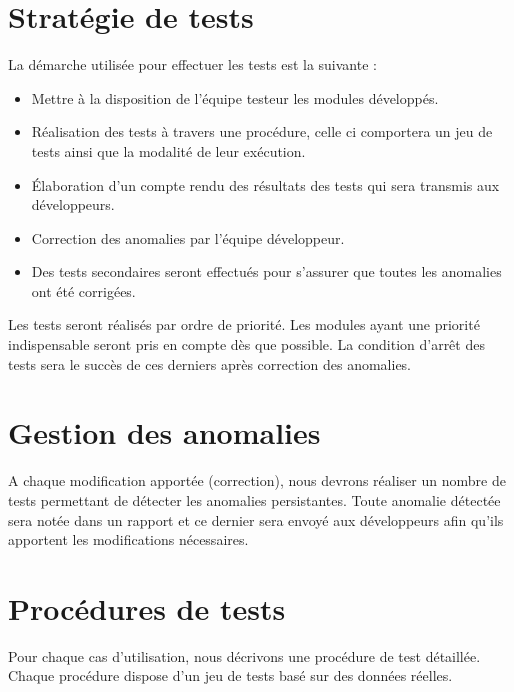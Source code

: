 \documentclass[a4paper,11pt,french]{article}
\begin{document}
\newpage
	
\section{Stratégie de tests}

La démarche utilisée pour effectuer les tests est la suivante :
\begin{itemize}
\item Mettre à la disposition de l’équipe testeur les modules développés.
\item Réalisation des tests à travers une procédure, celle ci comportera
un jeu de tests ainsi que la modalité de leur exécution.
\item Élaboration d'un compte rendu des résultats des tests qui sera
transmis aux développeurs.
\item Correction des anomalies par l'équipe développeur.
\item Des tests secondaires seront effectués pour s'assurer que toutes les
anomalies ont été corrigées.
\end{itemize}

Les tests seront réalisés par ordre de priorité. Les modules ayant une
priorité indispensable seront pris en compte dès que possible. La condition
d'arrêt des tests sera le succès de ces derniers après correction des
anomalies.

\section{Gestion des anomalies}

A chaque modification apportée (correction), nous devrons réaliser un nombre
de tests permettant de détecter les anomalies persistantes. Toute anomalie
détectée sera notée dans un rapport et ce dernier sera envoyé aux
développeurs afin qu'ils apportent les modifications nécessaires.

\section{Procédures de tests}
Pour chaque cas d’utilisation, nous décrivons une procédure de test
détaillée. Chaque procédure dispose d'un jeu de tests basé sur des
données réelles.
\end{document}
